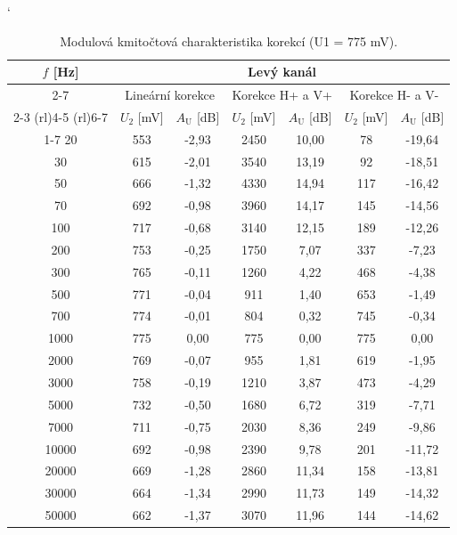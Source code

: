 \documentclass[a4paper, czech]{article}
\begin{document}
\begin{table}[H]
    \catcode`
    \centering
    \caption{Modulová kmitočtová charakteristika korekcí (U1 = 775 mV).}

    \begin{tabular}{ccccccc}
        \toprule
        \multirow{3}{*}{\setstretch{3}$f$ [Hz]} & \multicolumn{6}{c}{Levý kanál}\\
        \cmidrule(rl){2-7}
        & \multicolumn{2}{c}{Lineární korekce} & \multicolumn{2}{c}{Korekce H+ a V+} & \multicolumn{2}{c}{Korekce H- a V-}\\
        \cmidrule(rl){2-3}
        \cmidrule(rl){4-5}
        \cmidrule(rl){6-7}
        & $U_2$ [mV] & $A_\text{U}$ [dB] & $U_2$ [mV] & $A_\text{U}$ [dB] & $U_2$ [mV] & $A_\text{U}$ [dB] \\
        \cmidrule(rl){1-7}
        20    & 553 & -2,93 & 2450 & 10,00 & 78  & -19,64 \\
        30    & 615 & -2,01 & 3540 & 13,19 & 92  & -18,51 \\
        50    & 666 & -1,32 & 4330 & 14,94 & 117 & -16,42 \\
        70    & 692 & -0,98 & 3960 & 14,17 & 145 & -14,56 \\
        100   & 717 & -0,68 & 3140 & 12,15 & 189 & -12,26 \\
        200   & 753 & -0,25 & 1750 & 7,07  & 337 & -7,23 \\
        300   & 765 & -0,11 & 1260 & 4,22  & 468 & -4,38 \\
        500   & 771 & -0,04 & 911  & 1,40  & 653 & -1,49  \\
        700   & 774 & -0,01 & 804  & 0,32  & 745 & -0,34  \\
        1000  & 775 & 0,00  & 775  & 0,00  & 775 & 0,00   \\
        2000  & 769 & -0,07 & 955  & 1,81  & 619 & -1,95  \\
        3000  & 758 & -0,19 & 1210 & 3,87  & 473 & -4,29 \\
        5000  & 732 & -0,50 & 1680 & 6,72  & 319 & -7,71 \\
        7000  & 711 & -0,75 & 2030 & 8,36  & 249 & -9,86 \\
        10000 & 692 & -0,98 & 2390 & 9,78  & 201 & -11,72 \\
        20000 & 669 & -1,28 & 2860 & 11,34 & 158 & -13,81 \\
        30000 & 664 & -1,34 & 2990 & 11,73 & 149 & -14,32 \\
        50000 & 662 & -1,37 & 3070 & 11,96 & 144 & -14,62 \\
        \bottomrule
    \end{tabular}
\end{table}
\end{document}
